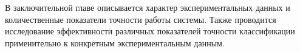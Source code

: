 В заключительной главе описывается характер экспериментальных данных и количественные показатели точности работы системы. Также проводится исследование эффективности различных показателей точности классификации применительно к конкретным экспериментальным данным.

%
%


